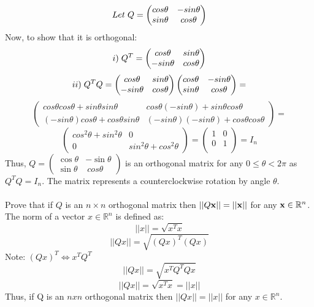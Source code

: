\documentclass{article}
\begin{document}
\[
Let\hspace{0.1cm}Q =
\begin{pmatrix}
cos\theta & -sin\theta\\
sin\theta & cos\theta\\
\end{pmatrix}
\]
Now, to show that it is orthogonal:
\[
i)\hspace{0.1cm}Q^T =
\begin{pmatrix}
cos\theta & sin\theta\\
-sin\theta & cos\theta\\
\end{pmatrix}
\]
\[
ii)\hspace{0.1cm}Q^TQ =
\begin{pmatrix}
cos\theta & sin\theta\\
-sin\theta & cos\theta\\
\end{pmatrix}
\begin{pmatrix}
cos\theta & -sin\theta\\
sin\theta & cos\theta\\
\end{pmatrix} =
\]
\[
\begin{pmatrix}
cos\theta cos\theta + sin\theta sin\theta & cos\theta (-sin\theta) + sin\theta cos\theta \\
(-sin\theta) cos\theta + cos\theta sin\theta & (-sin\theta) (-sin\theta) + cos\theta cos\theta
\end{pmatrix} = 
\]
\[
\begin{pmatrix}
cos^2\theta + sin^2\theta & 0\\
0 & sin^2\theta + cos^2\theta
\end{pmatrix}
=
\begin{pmatrix}
1 & 0 \\
0 & 1 \\
\end{pmatrix}
=
I_n
\]
Thus, $Q = \begin{pmatrix} \cos \theta & - \sin \theta \\ \sin \theta & \
cos \theta \end{pmatrix}$ is an orthogonal matrix for any $0 \leq \theta < 2\pi$ as $Q^TQ = I_n$. The matrix represents a counterclockwise rotation by angle $\theta$.\\\\

 Prove that if $Q$ is an $n \times n$ orthogonal matrix then $||Q {\bf x}
|| = ||{\bf x}||$ for any ${\bf x} \in \mathbb{R}^n$. \\

\noindent The norm of a vector $x \in \mathbb{R}^n$ is defined as:
\[
||x|| = \sqrt{x^Tx}
\]
\[
||Qx|| = \sqrt{(Qx)^T(Qx)}
\]
Note: $(Qx)^T \Leftrightarrow x^TQ^T$
\[
||Qx|| = \sqrt{x^TQ^TQx}
\]
\[
||Qx|| = \sqrt{x^Tx} = ||x||
\]
Thus, if Q is an $nxn$ orthogonal matrix then $||Qx|| = ||x||$ for any $x \in \mathbb{R}^n$.
\end{document}

